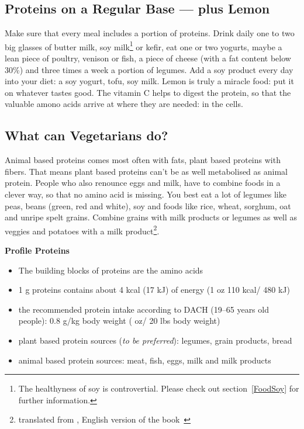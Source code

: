 \documentclass[../main.tex]{subfiles}
\begin{document}
      \subsection{Proteins on a Regular Base --- plus Lemon}

      Make sure that every meal includes a portion of proteins.
      Drink daily one to two big glasses of butter milk,
      soy milk\footnote{The healthyness of soy is controvertial. Please check out section~\ref{FoodSoy} for further information.}
      or kefir, eat one or two yogurts, maybe a lean piece of poultry, venison or fish,
      a piece of cheese (with a fat content below 30\%) and three times a week a portion of legumes.
      Add a soy product every day into your diet: a soy yogurt, tofu, soy milk.
      Lemon is truly a miracle food: put it on whatever tastes good.
      The vitamin C helps to digest the protein, so that the valuable amono acids arrive at where they are needed: in the cells.

      \subsection{What can Vegetarians do?}

      Animal based proteins comes most often with fats, plant based proteins with fibers.
      That means plant based proteins can't be as well metabolised as animal protein.
      People who also renounce eggs and milk, have to combine foods in a clever way, so that no amino acid is missing.
      You best eat a lot of legumes like peas, beans (green, red and white), soy and foods like rice, wheat, sorghum, oat and unripe spelt grains.
      Combine grains with milk products or legumes as well as veggies and potatoes with a
      milk product\footnote{translated from \cite{GLYX}, English version of the book~\cite{GLYX-En}}.

      
\vspace{5mm}
\noindent
\begin{fminipage}{\textwidth}
  \textbf{Profile Proteins}
  \begin{itemize}
  \item The building blocks of proteins are the amino acids
  \item 1 g proteins contains about 4 kcal (17 kJ) of energy (1 oz 110 kcal/ 480 kJ)
  \item the recommended protein intake according to DACH (19--65 years old people): 0.8 g/kg body weight ( oz/ 20 lbs body weight)
  \item plant based protein sources (\emph{to be preferred}): legumes, grain products, bread
    \item animal based protein sources: meat, fish, eggs, milk and milk products
  \end{itemize}
\end{fminipage}
\end{document}
